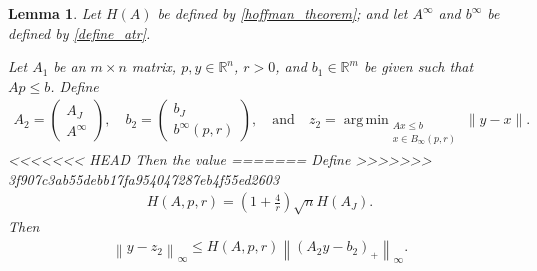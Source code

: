 \documentclass{article}
\newtheorem{lemma}[theorem]{Lemma}
\theoremstyle{case}
\numberwithin{theorem}{subsection}
\DeclareMathOperator*{\argmin}{arg\,min}
\newcommand{\atr}{A^{\infty}}
\newcommand{\btr}{b^{\infty}}
\newcommand{\bpr}{{B_{\infty}\left(p, r\right)}}
\newcommand{\Rm}{\mathbb R^m}
\newcommand{\Rn}{\mathbb R^n}
\begin{document}
\begin{lemma}
\label{version_of_hoffman_with_infinity_ball}
Let $H(A)$ be defined by \cref{hoffman_theorem}; and let $\atr$ and $\btr$ be defined by \cref{define_atr}.

Let $A_1$ be an $m \times n$ matrix, $p, y \in \Rn$, $r > 0$, and $b_1 \in \Rm$  be given 
such that $Ap \le b$.
Define 
\begin{align*}
A_2 = \begin{pmatrix} A_J \\ \atr \end{pmatrix},
\quad
b_2 = \begin{pmatrix} b_J \\ \btr\left(p, r\right) \end{pmatrix},
\quad \textrm{and} \quad
z_2 = \argmin_{\substack{A x \le b \\ x \in \bpr} } \|y - x\|.
\end{align*}
<<<<<<< HEAD
Then the value
=======
Define 
>>>>>>> 3f907c3ab55debb17fa954047287eb4f55ed2603
\begin{align}
H\left(A, p, r\right) = \left(1 + \frac 4 r\right)\sqrt{n} H\left(A_J\right).
\label{define_har}
\end{align}
Then
\begin{align*}
\left\|y - z_2\right\|_{\infty} 
\le 
H\left(A, p, r\right)
\left\|\left(A_2y - b_2\right)_+\right\|_{\infty}.
\end{align*}
\end{lemma}
\end{document}
